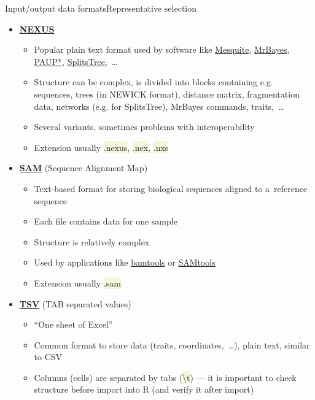 \documentclass[compress, ucs, xelatex, 11pt, xcolor=svgnames, aspectratio=169,
	hyperref={
		bookmarks=true,
		unicode=true,
		colorlinks=true,
		pdftitle={Molecular data in R},
		plainpages=false,
		pdfauthor={Vojtech Zeisek},
		pdfsubject={Course about phylogeny and evolution in R},
		pdfcreator={XeLaTeX},
		pdfkeywords={R, evolution, phylogeny, molecular data},
		linkcolor=Crimson, %
		anchorcolor=Magenta, %
		citecolor=Magenta, %
		filecolor=Magenta, %
		menucolor=Magenta, %
		urlcolor=DodgerBlue, %
		pdftex},
	url={hyphens, lowtilde} %
	]{beamer}
\renewcommand{\texttt}[1]{\colorbox{Beige}{{\ttfamily #1}}}
\begin{document}
\begin{frame}[allowframebreaks]{Input/output data formats}{Representative selection}
\begin{itemize}
\begin{itemize}
			\item Extension usually \texttt{*.newick}, \texttt{*.nwk}, \texttt{*.tre},~\ldots
		\end{itemize}
		\item \href{https://en.wikipedia.org/wiki/Nexus_file}{\textbf{NEXUS}}
		\begin{itemize}
			\item Popular plain text format used by software like \href{https://mesquiteproject.org/}{Mesquite}, \href{https://nbisweden.github.io/MrBayes/}{MrBayes}, \href{https://paup.phylosolutions.com/}{PAUP*}, \href{http://www.splitstree.org/}{SplitsTree},~\ldots
			\item Structure can be complex, is divided into blocks containing e.g. sequences, trees (in NEWICK format), distance matrix, fragmentation data, networks (e.g. for SplitsTree), MrBayes commands, traits,~\ldots
			\item Several variants, sometimes problems with interoperability
			\item Extension usually \texttt{*.nexus}, \texttt{*.nex}, \texttt{*.nxs}
		\end{itemize}
		\item \href{https://en.wikipedia.org/wiki/SAM_(file_format)}{\textbf{SAM}} (Sequence Alignment Map)
		\begin{itemize}
			\item Text-based format for storing biological sequences aligned to a~reference sequence
			\item Each file contains data for one sample
			\item Structure is relatively complex
			\item Used by applications like \href{https://github.com/pezmaster31/bamtools/wiki}{bamtools} or \href{https://www.htslib.org/}{SAMtools}
			\item Extension usually \texttt{*.sam}
		\end{itemize}
		\item \href{https://en.wikipedia.org/wiki/Tab-separated_values}{\textbf{TSV}} (TAB separated values)
		\begin{itemize}
			\item \enquote{One sheet of Excel}
			\item Common format to store data (traits, coordinates,~\ldots), plain text, similar to CSV
			\item Columns (cells) are separated by tabs (\texttt{\textbackslash t}) --- it is important to check structure before import into R (and verify it after import)

\end{itemize}
\end{itemize}
\end{frame}
\end{document}
